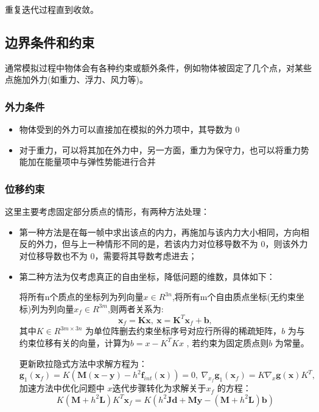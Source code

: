 \documentclass{article}
\begin{document}
	重复迭代过程直到收敛。
	
    \subsection{边界条件和约束}
    
	通常模拟过程中物体会有各种约束或额外条件，例如物体被固定了几个点，对某些点施加外力(如重力、浮力、风力等)。
	\subsubsection{外力条件}
	\begin{itemize}
		\item 	物体受到的外力可以直接加在模拟的外力项中，其导数为 0
	\end{itemize}
	\begin{itemize}
	\item 	对于重力，可以将其加在外力中，另一方面，重力为保守力，也可以将重力势能加在能量项中与弹性势能进行合并
   \end{itemize}
	\subsubsection{位移约束}
	这里主要考虑固定部分质点的情形，有两种方法处理：
		\begin{itemize}
		\item 	第一种方法是在每一帧中求出该点的内力，再施加与该内力大小相同，方向相反的外力，但与上一种情形不同的是，若该内力对位移导数不为 0，则该外力对位移导数也不为 0，需要将其导数考虑进去；
	\end{itemize}
	\begin{itemize}
	\item 	第二种方法为仅考虑真正的自由坐标，降低问题的维数，具体如下：
	
	将所有n个质点的坐标列为列向量$x\in R^{3n}$,将所有m个自由质点坐标(无约束坐标)列为列向量$x_f \in R^{3m}$,则两者关系为:$$ \boldsymbol x_f=\boldsymbol K\boldsymbol x,\ \boldsymbol x=\boldsymbol K^T\boldsymbol x_f+\boldsymbol b, $$ 其中$K \in R^{3m\times 3n}$ 
	为单位阵删去约束坐标序号对应行所得的稀疏矩阵，$b$ 为与约束位移有关的向量，计算为$b=x-K^{T}Kx$
	, 若约束为固定质点则$b$ 
	为常量。
	
	更新欧拉隐式方法中求解方程为： $$ \boldsymbol g_1(\boldsymbol x_f) = K(\boldsymbol M(\boldsymbol x-\boldsymbol y) -h^2\boldsymbol f_{int}(\boldsymbol x)) = 0,\ \nabla_{x_f} \boldsymbol g_1(\boldsymbol x_f) = K\nabla_{x} \boldsymbol g(\boldsymbol x)K^T,\ $$ 加速方法中优化问题中 
	$x$迭代步骤转化为求解关于$x_f$
	的方程： $$ K(\boldsymbol M+h^2\boldsymbol L)K^T\boldsymbol x_f=K(h^2\boldsymbol J \boldsymbol d+ \boldsymbol M \boldsymbol y-(\boldsymbol M+h^2\boldsymbol L)\boldsymbol b) $$
\end{itemize}
\end{document}
